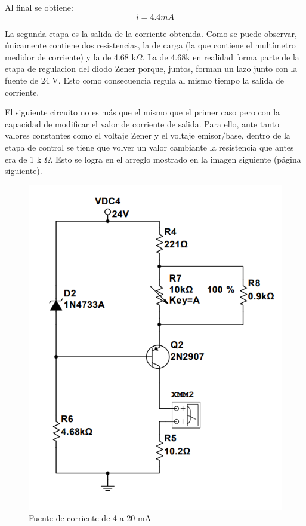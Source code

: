 Al final se obtiene:
\[ i = 4.4 mA \]

La segunda etapa es la salida de la corriente obtenida. Como se puede observar, únicamente contiene dos resistencias, la de
carga (la que contiene el multímetro medidor de corriente) y la de 4.68 k\(\Omega\). La de 4.68k en realidad forma parte de
la etapa de regulacion del diodo Zener porque, juntos, forman un lazo junto con la fuente de 24 V. Esto como consecuencia regula
al mismo tiempo la salida de corriente.

El siguiente circuito no es más que el mismo que el primer caso pero con la capacidad de modificar el valor de corriente de salida.
Para ello, ante tanto valores constantes como el voltaje Zener y el voltaje emisor/base, dentro de la etapa de control se tiene
que volver un valor cambiante la resistencia que antes era de 1 k \(\Omega\). Esto se logra en el arreglo mostrado en la imagen 
siguiente (página siguiente).

\begin{figure}[htb]
    \centering
    \includegraphics[scale=0.6]{media/casoB.png}
    \caption{Fuente de corriente de 4 a 20 mA}
    \label{Fig: Fuente de corriente de 4 a 20 mA}
\end{figure}


